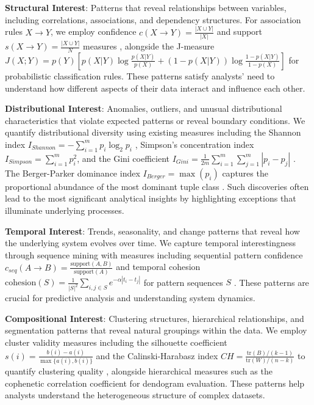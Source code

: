 \documentclass[sigconf, nonacm]{acmart}
\begin{document}
\textbf{Structural Interest}: Patterns that reveal relationships between variables, including correlations, associations, and dependency structures. For association rules $X \rightarrow Y$, we employ confidence $c(X \rightarrow Y) = \frac{|X \cup Y|}{|X|}$ and support $s(X \rightarrow Y) = \frac{|X \cup Y|}{N}$ measures \cite{aggarwalNewApproachOnline2001}, alongside the J-measure $J(X;Y) = p(Y)[p(X|Y)\log\frac{p(X|Y)}{p(X)} + (1-p(X|Y))\log\frac{1-p(X|Y)}{1-p(X)}]$ \cite{goodman1991rule} for probabilistic classification rules. These patterns satisfy analysts' need to understand how different aspects of their data interact and influence each other.

\textbf{Distributional Interest}: Anomalies, outliers, and unusual distributional characteristics that violate expected patterns or reveal boundary conditions. We quantify distributional diversity using existing measures including the Shannon index $I_{Shannon} = -\sum_{i=1}^{m} p_i \log_2 p_i$ \cite{shannon1948mathematical}, Simpson's concentration index $I_{Simpson} = \sum_{i=1}^{m} p_i^2$, and the Gini coefficient $I_{Gini} = \frac{1}{2m}\sum_{i=1}^{m}\sum_{j=1}^{m}|p_i - p_j|$ \cite{gini1921measurement}. The Berger-Parker dominance index $I_{Berger} = \max(p_i)$ captures the proportional abundance of the most dominant tuple class \cite{bergerDiversityPlanktonicForaminifera1970}. Such discoveries often lead to the most significant analytical insights by highlighting exceptions that illuminate underlying processes.

\textbf{Temporal Interest}: Trends, seasonality, and change patterns that reveal how the underlying system evolves over time. We capture temporal interestingness through sequence mining with measures including sequential pattern confidence $c_{seq}(A \rightarrow B) = \frac{\text{support}(A,B)}{\text{support}(A)}$ and temporal cohesion $\text{cohesion}(S) = \frac{1}{|S|^2}\sum_{i,j \in S} e^{-\alpha|t_i - t_j|}$ for pattern sequences $S$ \cite{mannila1997discovery}. These patterns are crucial for predictive analysis and understanding system dynamics.

\textbf{Compositional Interest}: Clustering structures, hierarchical relationships, and segmentation patterns that reveal natural groupings within the data. We employ cluster validity measures including the silhouette coefficient $s(i) = \frac{b(i) - a(i)}{\max\{a(i), b(i)\}}$ and the Calinski-Harabasz index $CH = \frac{\text{tr}(B)/(k-1)}{\text{tr}(W)/(n-k)}$ to quantify clustering quality \cite{kaufman2009finding}, alongside hierarchical measures such as the cophenetic correlation coefficient for dendogram evaluation. These patterns help analysts understand the heterogeneous structure of complex datasets.
\end{document}
